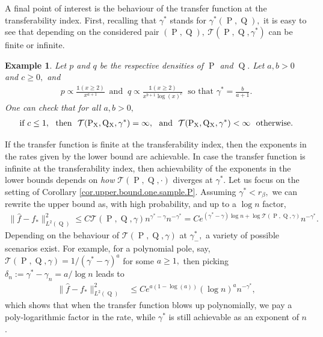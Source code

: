 \documentclass[10pt]{article}
\newcommand{\mT}{\mathcal{T}}
\renewcommand{\P}{\operatorname{P}}
\newcommand{\Q}{\operatorname{Q}}
\newcommand{\wh}{\widehat}
\newcommand{\sX}{\mathrm{X}}
\newtheorem{example}[theorem]{Example}
\begin{document}
A final point of interest is the behaviour of the transfer function at the transferability index. First, recalling that $\gamma^*$ stands for $\gamma^*(\P, \Q),$ it is easy to see that depending on the considered pair $(\P, \Q), \ \mT(\P, \Q, \gamma^*)$ can be finite or infinite.
\begin{example}\label{lem.ratio.bound.main.text}
    Let $p$ and $q$ be the respective densities of $\P$ and $\Q.$ Let $a, b > 0$ and $c \geq 0,$ and 
    \begin{align*}
        p \propto \frac{\mathds{1}(x\geq 2)}{x^{a + 1}}\, \text{ and } \ q \propto \frac{\mathds{1}(x \geq 2)}{x^{b+1}\log(x)^{c}} \ \text{ so that } \gamma^* = \frac{b}{a + 1}.
    \end{align*}
    One can check that for all $a, b > 0,$ 
    \begin{align*}
        \text{if } c \leq 1, \ \text{ then } \ \mT(\P_{\sX}, \Q\mathstrut_{\!\sX}, \gamma^*) = \infty, \ \text{ and } \ \mT(\P_{\sX}, \Q\mathstrut_{\!\sX}, \gamma^*) < \infty \ \text{ otherwise.}
    \end{align*}
\end{example}
If the transfer function is finite at the transferability index, then the exponents in the rates given by the lower bound are achievable. In case the transfer function is infinite at the transferability index, then achievability of the exponents in the lower bounds depends on \textit{how} $\mT(\P, \Q, \cdot)$ diverges at $\gamma^*.$ Let us focus on the setting of Corollary \ref{cor.upper.bound.one.sample.P}. Assuming $\gamma^* < r_\beta,$ we can rewrite the upper bound as, with high probability, and up to a $\log n$ factor,
\begin{align*}
    \big\|\wh f - f_*\big\|_{L^2(\Q)}^2 \leq C\mT(\P, \Q, \gamma)n^{\gamma^* - \gamma}n^{-\gamma^*} = Ce^{(\gamma^* - \gamma)\log n + \log \mT(\P, \Q, \gamma)}n^{-\gamma^*}.
\end{align*}
Depending on the behaviour of $\mT(\P, \Q, \gamma)$ at $\gamma^*_-,$ a variety of possible scenarios exist. For example, for a polynomial pole, say, $\mT(\P, \Q, \gamma) = 1/(\gamma^* - \gamma)^a$ for some $a \geq 1,$ then picking $\delta_n := \gamma^* - \gamma_n = a/\log n$ leads to
\begin{align*}
    \big\|\wh f - f_*\big\|_{L^2(\Q)}^2 &\leq Ce^{a(1 - \log(a))}(\log n)^an^{-\gamma^*},
\end{align*}
which shows that when the transfer function blows up polynomially, we pay a poly-logarithmic factor in the rate, while $\gamma^*$ is still achievable as an exponent of $n$.
\end{document}
